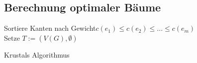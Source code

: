 \subsection{Berechnung optimaler Bäume}
\begin{algorithm}
	\vspace*{5pt}
	Sortiere Kanten nach Gewicht\newline $c(e_1)\le c(e_2)\le ... \le c(e_m)$\\
	Setze $T:=(V(G), \emptyset)$\\
	{
	}
	\caption{Krustals Algorithmus}
	\label{fig:Algorithmus}
\end{algorithm}
	